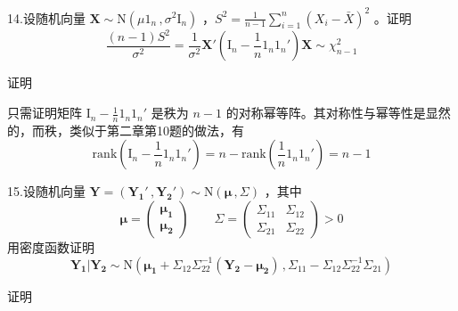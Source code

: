 \documentclass[12pt,hyperref,]{ctexart}
\begin{document}
\vspace{3em}

\kaishu

14.设随机向量
\(\boldsymbol{X}\sim\mathrm{N}(\mu 1_n\, ,\sigma^2\mathrm{I}_n)\)
，\(S^2=\frac{1}{n-1}\sum_{i=1}^n(X_i-\bar{X})^2\) 。证明
\begin{equation*}
\frac{(n-1)S^2}{\sigma^2}=\frac{1}{\sigma^2}\boldsymbol{X}'\left(\mathrm{I}_n-\frac{1}{n}1_n1_n'\right)\boldsymbol{X}\sim \chi_{n-1}^2
\end{equation*}

\heiti

证明

\songti

只需证明矩阵 \(\mathrm{I}_n-\frac{1}{n}1_n1_n'\) 是秩为 \(n-1\)
的对称幂等阵。其对称性与幂等性是显然的，而秩，类似于第二章第10题的做法，有
\begin{equation*}
\mathrm{rank}\left(\mathrm{I}_n-\frac{1}{n}1_n1_n'\right)=n-\mathrm{rank}\left(\frac{1}{n}1_n1_n'\right)=n-1
\end{equation*}

\vspace{3em}

\kaishu

15.设随机向量
\(\boldsymbol{Y}=(\boldsymbol{Y_1}'\, ,\boldsymbol{Y_2}')\sim \mathrm{N}(\boldsymbol{\mu}\, ,\Sigma)\)
，其中 \begin{equation*}
\boldsymbol{\mu}=
\begin{pmatrix}
\boldsymbol{\mu_1} \\
\boldsymbol{\mu_2}
\end{pmatrix} \qquad
\Sigma=
\begin{pmatrix}
\Sigma_{11} & \Sigma_{12} \\
\Sigma_{21} & \Sigma_{22}
\end{pmatrix} >0
\end{equation*}用密度函数证明 \begin{equation*}
\boldsymbol{Y_1}|\boldsymbol{Y_2}\sim\mathrm{N}\left(\boldsymbol{\mu_1}+\Sigma_{12}\Sigma_{22}^{-1}(\boldsymbol{Y_2}-\boldsymbol{\mu_2})\, ,\Sigma_{11}-\Sigma_{12}\Sigma_{22}^{-1}\Sigma_{21}\right)
\end{equation*}

\heiti

证明

\songti
\end{document}
